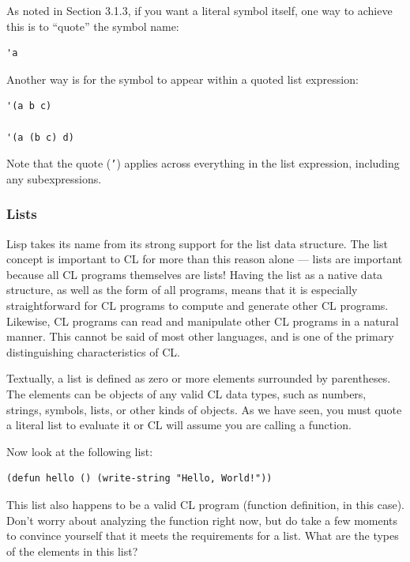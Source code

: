 As noted in Section 3.1.3, if you want a literal symbol itself, one way to achieve this is
to ``quote'' the symbol name:

\begin{verbatim}
'a
\end{verbatim}

Another way is for the symbol to appear within a quoted list expression:

\begin{verbatim}
'(a b c)

'(a (b c) d)
\end{verbatim}

Note that the quote (\texttt{'}) applies across everything in the list expression, including any subexpressions.

\subsubsection{Lists}

Lisp takes its name from its strong support for the list data structure. The list concept
is important to CL for more than this reason alone --- lists are important because all CL
programs themselves are lists! Having the list as a native data structure, as well as the form
of all programs, means that it is especially straightforward for CL programs to compute
and generate other CL programs. Likewise, CL programs can read and manipulate other
CL programs in a natural manner. This cannot be said of most other languages, and is one
of the primary distinguishing characteristics of CL.

Textually, a list is defined as zero or more elements surrounded by parentheses. The
elements can be objects of any valid CL data types, such as numbers, strings, symbols, lists,
or other kinds of objects. As we have seen, you must quote a literal list to evaluate it or
CL will assume you are calling a function.

Now look at the following list:

\begin{verbatim}
(defun hello () (write-string "Hello, World!"))
\end{verbatim}

This list also happens to be a valid CL program (function definition, in this case). Don't
worry about analyzing the function right now, but do take a few moments to convince
yourself that it meets the requirements for a list. What are the types of the elements in
this list?

